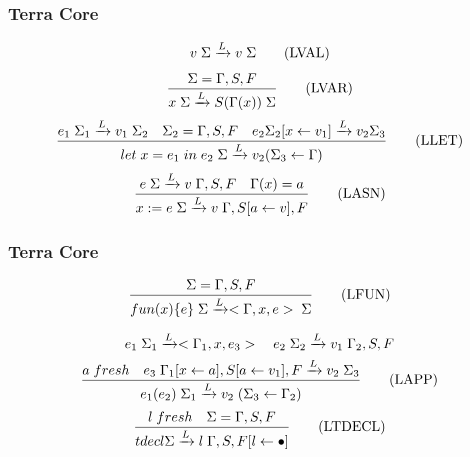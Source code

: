 \documentclass{beamer}
\begin{document}
\begin{frame}
  \frametitle{Terra Core}
  \begin{equation}
    v\thickspace \Sigma \xrightarrow[]{L} v\thickspace \Sigma \tag{LVAL}
  \end{equation}
  \newline
  \begin{equation}
    \frac{\Sigma = \Gamma, S, F}{x\thickspace \Sigma \xrightarrow[]{L} S(\Gamma{(x)})\thickspace \Sigma}\tag{LVAR}
  \end{equation}
  \newline
  \begin{equation}
    \frac{e_1 \thickspace \Sigma_1 \xrightarrow[]{L} v_1 \thickspace \Sigma_2 \quad \Sigma_2 = \Gamma, S, F \quad e_2 \Sigma_2[x \leftarrow v_1] \xrightarrow[]{L} v_2 \Sigma_3}{let \thickspace x = e_1 \thickspace in \thickspace e_2 \thickspace \Sigma \xrightarrow[]{L} v_2(\Sigma_3 \leftarrow \Gamma)} \tag{LLET}
  \end{equation}
  \newline
  \begin{equation}
    \frac{e \thickspace \Sigma \xrightarrow[]{L} v\thickspace \Gamma, S, F \quad \Gamma{(x)} = a}{x := e \thickspace \Sigma \xrightarrow[]{L} v \thickspace \Gamma, S[a \leftarrow v], F} \tag{LASN}
  \end{equation}
\end{frame}

\begin{frame}
  \frametitle{Terra Core}
	\begin{equation}
    \frac{\Sigma = \Gamma, S, F}{fun(x)\{e\} \thickspace \Sigma \xrightarrow[]{L} <\Gamma, x, e> \thickspace \Sigma} \tag{LFUN}
  \end{equation}
  \newline
  
  \begin{gather*}
    e_1 \thickspace \Sigma_1 \xrightarrow[]{L} <\Gamma_1, x, e_3> \quad e_2 \thickspace \Sigma_2 \xrightarrow[]{L} v_1 \thickspace \Gamma_2, S, F \\
    \frac{a \thickspace fresh \quad e_3 \thickspace \Gamma_1[x \leftarrow a], S[a \leftarrow v_1], F \xrightarrow[]{L} v_2 \thickspace \Sigma_3}{e_1(e_2) \thickspace \Sigma_1 \xrightarrow[]{L} v_2 \thickspace (\Sigma_3 \leftarrow \Gamma_2)}\tag{LAPP}
  \end{gather*}
  \newline
  \begin{equation}
    \frac{l\thickspace fresh \quad \Sigma = \Gamma, S, F}{tdecl \Sigma \xrightarrow[]{L} l \thickspace \Gamma, S, F[l \leftarrow \bullet]} \tag{LTDECL}
  \end{equation}
\end{frame}
\end{document}
